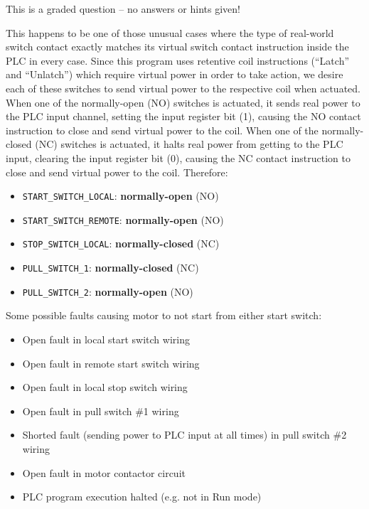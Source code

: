\vfil
{}
\eject






This is a graded question -- no answers or hints given!







This happens to be one of those unusual cases where the type of real-world switch contact exactly matches its virtual switch contact instruction inside the PLC in every case.  Since this program uses retentive coil instructions (``Latch'' and ``Unlatch'') which require virtual power in order to take action, we desire each of these switches to send virtual power to the respective coil when actuated.  When one of the normally-open (NO) switches is actuated, it sends real power to the PLC input channel, setting the input register bit (1), causing the NO contact instruction to close and send virtual power to the coil.  When one of the normally-closed (NC) switches is actuated, it halts real power from getting to the PLC input, clearing the input register bit (0), causing the NC contact instruction to close and send virtual power to the coil.  Therefore:

\begin{itemize}
\item{} {\tt START\_SWITCH\_LOCAL}: {\bf normally-open} (NO)
\item{} {\tt START\_SWITCH\_REMOTE}: {\bf normally-open} (NO)
\item{} {\tt STOP\_SWITCH\_LOCAL}: {\bf normally-closed} (NC)
\item{} {\tt PULL\_SWITCH\_1}: {\bf normally-closed} (NC)
\item{} {\tt PULL\_SWITCH\_2}: {\bf normally-open} (NO)
\end{itemize}

\vskip 10pt

\noindent
Some possible faults causing motor to not start from either start switch:

\begin{itemize}
\item{} Open fault in local start switch wiring
\item{} Open fault in remote start switch wiring
\item{} Open fault in local stop switch wiring
\item{} Open fault in pull switch \#1 wiring
\item{} Shorted fault (sending power to PLC input at all times) in pull switch \#2 wiring
\item{} Open fault in motor contactor circuit
\item{} PLC program execution halted (e.g. not in Run mode)
\end{itemize}





